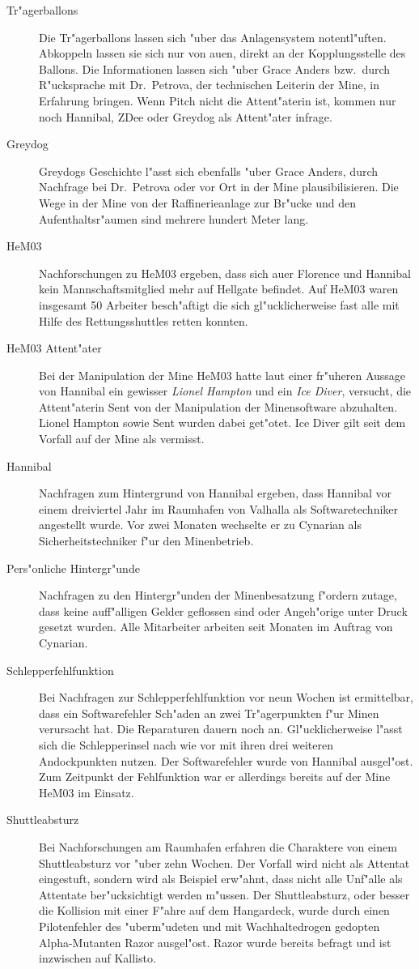 \begin{description}
	\item[Tr"agerballons] Die Tr"agerballons lassen sich "uber das Anlagensystem notentl"uften. Abkoppeln lassen sie sich nur von au\3en, direkt 
		an der Kopplungsstelle des Ballons. Die Informationen lassen sich "uber Grace Anders bzw.~durch R"ucksprache mit Dr.~Petrova, der technischen Leiterin der Mine, in Erfahrung bringen. Wenn Pitch nicht die Attent"aterin ist, kommen nur noch Hannibal, ZDee oder Greydog als Attent"ater infrage.
	\item[Greydog] Greydogs Geschichte l"asst sich ebenfalls "uber Grace Anders, durch Nachfrage bei Dr.~Petrova oder vor Ort in der Mine 
		plausibilisieren. Die Wege in der Mine von der Raffinerieanlage zur Br"ucke und den Aufenthaltsr"aumen sind mehrere hundert Meter lang.
	\item[HeM03] Nachforschungen zu HeM03 ergeben, dass sich au\3er Florence und Hannibal kein Mannschaftsmitglied mehr auf Hellgate befindet. Auf HeM03 waren insgesamt 50 Arbeiter besch"aftigt die sich gl"ucklicherweise fast alle mit Hilfe des Rettungsshuttles retten konnten. 
	\item[HeM03 Attent"ater] Bei der Manipulation der Mine HeM03 hatte laut einer fr"uheren Aussage von Hannibal ein gewisser \emph{Lionel 
		Hampton} und ein \emph{Ice Diver}, versucht, die Attent"aterin Sent von der Manipulation der Minensoftware abzuhalten. Lionel Hampton sowie Sent wurden dabei get"otet. Ice Diver gilt seit dem Vorfall auf der Mine als vermisst.
	\item[Hannibal] Nachfragen zum Hintergrund von Hannibal ergeben, dass Hannibal vor einem dreiviertel Jahr im Raumhafen von Valhalla als 
		Softwaretechniker angestellt wurde. Vor zwei Monaten wechselte er zu Cynarian als Sicherheitstechniker f"ur den Minenbetrieb.
	\item[Pers"onliche Hintergr"unde] Nachfragen zu den Hintergr"unden der Minenbesatzung f"ordern zutage, dass keine auff"alligen Gelder 
		geflossen sind oder Angeh"orige unter Druck gesetzt wurden. Alle Mitarbeiter arbeiten seit Monaten im Auftrag von Cynarian.
	\item[Schlepperfehlfunktion] Bei Nachfragen zur Schlepperfehlfunktion vor neun Wochen ist ermittelbar, dass ein Softwarefehler Sch"aden 
		an zwei Tr"agerpunkten f"ur Minen verursacht hat. Die Reparaturen dauern noch an. Gl"ucklicherweise l"asst sich die Schlepperinsel nach wie vor mit ihren drei weiteren Andockpunkten nutzen. Der Softwarefehler wurde von Hannibal ausgel"ost. Zum Zeitpunkt der Fehlfunktion war er allerdings bereits auf der Mine HeM03 im Einsatz.
	\item[Shuttleabsturz] Bei Nachforschungen am Raumhafen erfahren die Charaktere von einem Shuttleabsturz vor "uber zehn Wochen. Der 
		Vorfall wird nicht als Attentat eingestuft, sondern wird als Beispiel erw"ahnt, dass nicht alle Unf"alle als Attentate ber"ucksichtigt werden m"ussen. Der Shuttleabsturz, oder besser die Kollision mit einer F"ahre auf dem Hangardeck, wurde durch einen Pilotenfehler des "uberm"udeten und mit Wachhaltedrogen gedopten Alpha-Mutanten Razor ausgel"ost. Razor wurde bereits befragt und ist inzwischen auf Kallisto.
\end{description}


